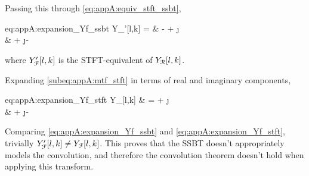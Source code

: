 Passing this through \cref{eq:appA:equiv_stft_ssbt},
\begin{equations}{eq:appA:expansion_Yf_ssbt}
	Y_{\F}'[l,k] =
	& - \xfr[l,k] \hfr[l,k] + \j \xfr[l,k] \hfr[l,k] \\
	& + \j \xfi[l,k] \hfr[l,k] - \xfi[l,k] \hfi[l,k]
\end{equations}
where $Y_{\mathcal{F}}'[l,k]$ is the STFT-equivalent of $Y_{\mathcal{R}}[l,k]$.

Expanding \cref{subeq:appA:mtf_stft} in terms of real and imaginary components,
\begin{equations}{eq:appA:expansion_Yf_stft}
	Y_{\F}[l,k] 
	& = \xfr[l,k] \hfr[l,k] + \j \xfr[l,k] \hfi[l,k] \\
	& + \j \xfi[l,k] \hfr[l,k] - \xfi[l,k] \hfi[l,k]
\end{equations}

Comparing \cref{eq:appA:expansion_Yf_ssbt} and \cref{eq:appA:expansion_Yf_stft}, trivially $Y_{\mathcal{F}}'[l,k] \neq Y_{\mathcal{F}}[l,k]$. This proves that the SSBT doesn't appropriately models the convolution, and therefore the convolution theorem doesn't hold when applying this transform.